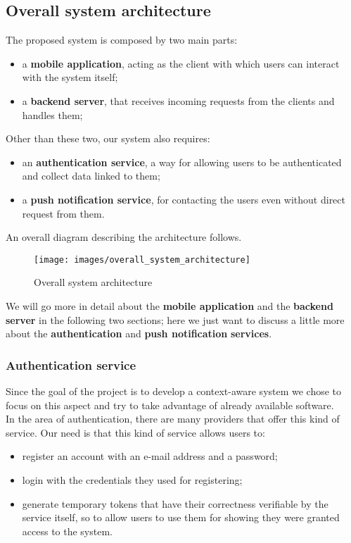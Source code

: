 \documentclass[../../main]{subfiles}
\begin{document}
\label{ss:overall-system-architecture}
\subsection{Overall system architecture}
The proposed system is composed by two main parts:
\begin{itemize}
    \item a \textbf{mobile application}, acting as the client with which users can interact with the system itself;
    \item a \textbf{backend server}, that receives incoming requests from the clients and handles them;
\end{itemize}
Other than these two, our system also requires:
\begin{itemize}
    \item an \textbf{authentication service}, a way for allowing users to be authenticated and collect data linked to them;
    \item a \textbf{push notification service}, for contacting the users even without direct request from them.
\end{itemize}
An overall diagram describing the architecture follows.
\begin{figure}[h]
    \centering
    \texttt{[image: images/overall\_system\_architecture]}
    \caption{Overall system architecture}\label{fig:overall_system_architecture}
\end{figure}

\noindent
We will go more in detail about the \textbf{mobile application} and the \textbf{backend server} in the following two sections; here we just want to discuss a little more about the \textbf{authentication} and \textbf{push notification} \textbf{services}.

\subsubsection{Authentication service}
Since the goal of the project is to develop a context-aware system we chose to focus on this aspect and try to take advantage of already available software.\\
In the area of authentication, there are many providers that offer this kind of service. Our need is that this kind of service allows users to:
\begin{itemize}
    \item register an account with an e-mail address and a password;
    \item login with the credentials they used for registering;
    \item generate temporary tokens that have their correctness verifiable by the service itself, so to allow users to use them for showing they were granted access to the system.
\end{itemize}
\end{document}
